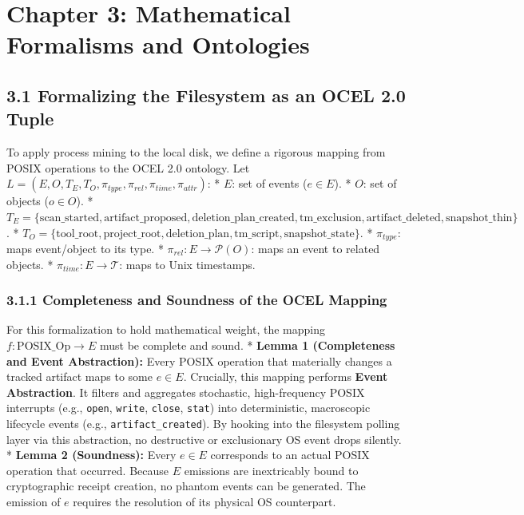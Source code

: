 \documentclass[
  12pt,
]{report}
\begin{document}
\chapter{Chapter 3: Mathematical Formalisms and
Ontologies}\label{chapter-3-mathematical-formalisms-and-ontologies}

\section{3.1 Formalizing the Filesystem as an OCEL 2.0
Tuple}\label{formalizing-the-filesystem-as-an-ocel-2.0-tuple}

To apply process mining to the local disk, we define a rigorous mapping
from POSIX operations to the OCEL 2.0 ontology. Let
\(L = (E, O, T_E, T_O, \pi_{type}, \pi_{rel}, \pi_{time}, \pi_{attr})\):
* \(E\): set of events (\(e \in E\)). * \(O\): set of objects
(\(o \in O\)). *
\(T_E = \{ \text{scan\_started}, \text{artifact\_proposed}, \text{deletion\_plan\_created}, \text{tm\_exclusion}, \text{artifact\_deleted}, \text{snapshot\_thin} \}\).
*
\(T_O = \{ \text{tool\_root}, \text{project\_root}, \text{deletion\_plan}, \text{tm\_script}, \text{snapshot\_state} \}\).
* \(\pi_{type}\): maps event/object to its type. *
\(\pi_{rel}: E \rightarrow \mathcal{P}(O)\): maps an event to related
objects. * \(\pi_{time}: E \rightarrow \mathcal{T}\): maps to Unix
timestamps.

\subsection{3.1.1 Completeness and Soundness of the OCEL
Mapping}\label{completeness-and-soundness-of-the-ocel-mapping}

For this formalization to hold mathematical weight, the mapping
\(f: \text{POSIX\_Op} \rightarrow E\) must be complete and sound. *
\textbf{Lemma 1 (Completeness and Event Abstraction):} Every POSIX
operation that materially changes a tracked artifact maps to some
\(e \in E\). Crucially, this mapping performs \textbf{Event
Abstraction}. It filters and aggregates stochastic, high-frequency POSIX
interrupts (e.g., \texttt{open}, \texttt{write}, \texttt{close},
\texttt{stat}) into deterministic, macroscopic lifecycle events (e.g.,
\texttt{artifact\_created}). By hooking into the filesystem polling
layer via this abstraction, no destructive or exclusionary OS event
drops silently. * \textbf{Lemma 2 (Soundness):} Every \(e \in E\)
corresponds to an actual POSIX operation that occurred. Because \(E\)
emissions are inextricably bound to cryptographic receipt creation, no
phantom events can be generated. The emission of \(e\) requires the
resolution of its physical OS counterpart.
\end{document}
